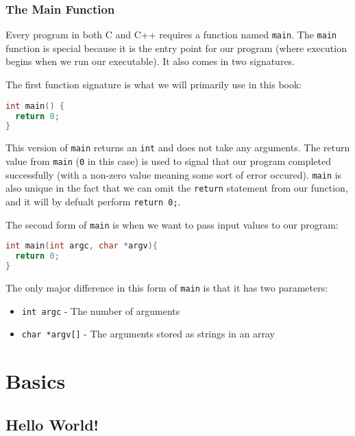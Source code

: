 \documentclass[11pt,fancy,authoryear]{elegantbook}
\begin{document}
\subsection{The Main Function}

Every program in both C and C++ requires a function named \lstinline{main}. The \lstinline{main} function is special because it is the entry point for our program (where execution begins when we run our executable). It also comes in two signatures.

The first function signature is what we will primarily use in this book:

\begin{lstlisting}[language=C++]
int main() {
  return 0;
}
\end{lstlisting}

This version of \lstinline{main} returns an \lstinline{int} and does not take any arguments. The return value from \lstinline{main} (\lstinline{0} in this case) is used to signal that our program completed successfully (with a non-zero value meaning some sort of error occured). \lstinline{main} is also unique in the fact that we can omit the \lstinline{return} statement from our function, and it will by defualt perform \lstinline{return 0;}.

The second form of \lstinline{main} is when we want to pass input values to our program:

\begin{lstlisting}[language=C++]
int main(int argc, char *argv){
  return 0;
}
\end{lstlisting}

The only major difference in this form of \lstinline{main} is that it has two parameters:

\begin{itemize}
  \item \lstinline{int argc} - The number of arguments
  \item \lstinline{char *argv[]} - The arguments stored as strings in an array
\end{itemize}

\chapter{Basics}

\section{Hello World!}
\end{document}
